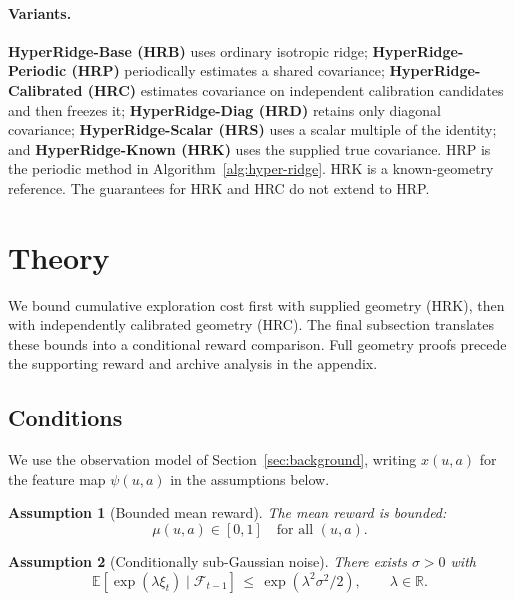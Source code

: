 \documentclass{article} %
\newtheorem{assumption}{Assumption}
\providecommand{\E}{\mathbb{E}}
\begin{document}
\FloatBarrier
\paragraph{Variants.}
\textbf{HyperRidge-Base (HRB)} uses ordinary isotropic ridge;
\textbf{HyperRidge-Periodic (HRP)} periodically estimates a shared covariance;
\textbf{HyperRidge-Calibrated (HRC)} estimates covariance on independent
calibration candidates and then freezes it;
\textbf{HyperRidge-Diag (HRD)} retains only diagonal covariance;
\textbf{HyperRidge-Scalar (HRS)} uses a scalar multiple of the identity; and
\textbf{HyperRidge-Known (HRK)} uses the supplied true covariance.
HRP is the periodic method in Algorithm~\ref{alg:hyper-ridge}.
HRK is a known-geometry reference.
The guarantees for HRK and HRC do not extend to HRP.

\FloatBarrier
\section{Theory}
\label{sec:hyper-theory}
\label{sec:theory}

We bound cumulative exploration cost first with supplied geometry (HRK),
then with independently calibrated geometry (HRC). The final subsection
translates these bounds into a conditional reward comparison. Full geometry
proofs precede the supporting reward and archive analysis in the appendix.

\subsection{Conditions}
\label{sec:method-assump}

We use the observation model of Section~\ref{sec:background}, writing
$x(u,a)$ for the feature map $\psi(u,a)$ in the assumptions below.

\begin{assumption}[Bounded mean reward]
\label{ass:bounded}
The mean reward is bounded:
\begin{equation}
\label{eq:ass-bounded}
\mu(u,a) \in [0,1] \quad \text{for all } (u,a).
\end{equation}
\end{assumption}

\begin{assumption}[Conditionally sub-Gaussian noise]
\label{ass:subg}
There exists $\sigma > 0$ with
\begin{equation}
\label{eq:ass-subg}
\E\!\left[\exp(\lambda \xi_t) \mid \mathcal{F}_{t-1}\right] \,\le\, \exp(\lambda^2 \sigma^2 / 2), \qquad \lambda \in \mathbb{R}.
\end{equation}
\end{assumption}
\end{document}
